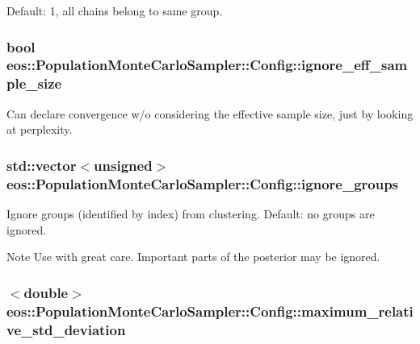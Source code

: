 Default: 1, all chains belong to same group. \hypertarget{structeos_1_1PopulationMonteCarloSampler_1_1Config_aec486491bd33a3edf40a6062b07e4066}{
\subsubsection[{ignore\_\-eff\_\-sample\_\-size}]{\setlength{\rightskip}{0pt plus 5cm}bool {\bf eos::PopulationMonteCarloSampler::Config::ignore\_\-eff\_\-sample\_\-size}}}
\label{structeos_1_1PopulationMonteCarloSampler_1_1Config_aec486491bd33a3edf40a6062b07e4066}
Can declare convergence w/o considering the effective sample size, just by looking at perplexity. \hypertarget{structeos_1_1PopulationMonteCarloSampler_1_1Config_a27ea93f2181c10068424f2b7e24fbc14}{
\subsubsection[{ignore\_\-groups}]{\setlength{\rightskip}{0pt plus 5cm}std::vector$<$unsigned$>$ {\bf eos::PopulationMonteCarloSampler::Config::ignore\_\-groups}}}
\label{structeos_1_1PopulationMonteCarloSampler_1_1Config_a27ea93f2181c10068424f2b7e24fbc14}
Ignore groups (identified by index) from clustering. Default: no groups are ignored. \begin{DoxyNote}{Note}
Use with great care. Important parts of the posterior may be ignored. 
\end{DoxyNote}
\hypertarget{structeos_1_1PopulationMonteCarloSampler_1_1Config_ac0e8dec5f8ba7e5f0c997dd8a65fc231}{
\subsubsection[{maximum\_\-relative\_\-std\_\-deviation}]{$<$double$>$ {\bf eos::PopulationMonteCarloSampler::Config::maximum\_\-relative\_\-std\_\-deviation}}}
\label{structeos_1_1PopulationMonteCarloSampler_1_1Config_ac0e8dec5f8ba7e5f0c997dd8a65fc231}



